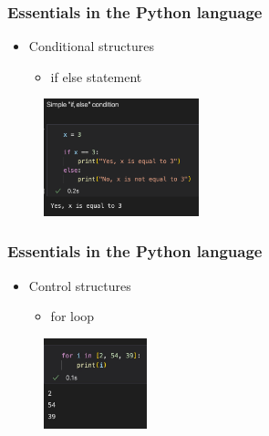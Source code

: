\begin{frame}\frametitle{Essentials in the Python language}
   \begin{minipage}{0.48\linewidth}
      \begin{itemize}
         \item Conditional structures
         \begin{itemize}
            \item if else statement
         \end{itemize}
      \end{itemize}
   \end{minipage}
   \begin{minipage}{0.48\linewidth}
      \begin{figure}[H]
         \includegraphics[width=4.5cm]{../images/illustrations/if_else.png}
      \end{figure}
   \end{minipage}
\end{frame}


\begin{frame}\frametitle{Essentials in the Python language}
   \begin{minipage}{0.48\linewidth}
      \begin{itemize}
         \item Control structures
         \begin{itemize}
            \item for loop
         \end{itemize}
      \end{itemize}
   \end{minipage}
   \begin{minipage}{0.48\linewidth}
      \begin{figure}[H]
         \includegraphics[width=3cm]{../images/illustrations/for.jpg}
      \end{figure}
   \end{minipage}
\end{frame}



